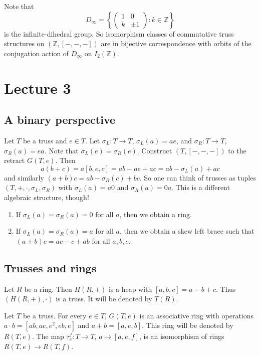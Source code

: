 \documentclass{svmult}
\newcommand{\Z}{\mathbb{Z}}
\begin{document}
Note that
\[
D_\infty=\left\{\begin{pmatrix}
1&0\\k&\pm 1
\end{pmatrix}:k\in\Z\right\}
\]
is the infinite-dihedral group. So isomorphism classes
of commutative truss structures on 
$\left(\Z,[-,-,-]\right)$ are in bijective correspondence with orbits of the conjugation 
action of $D_\infty$ on $I_2(\Z)$. 

\section{Lecture 3}

\subsection{A binary perspective}

Let $T$ be a truss and $e\in T$. Let $\sigma_L\colon T\to T$, $\sigma_L(a)=ae$, and 
$\sigma_R\colon T\to T$, $\sigma_R(a)=ea$. Note that $\sigma_L(e)=\sigma_R(e)$. 
Construct $\left(T,[-,-,-]\right)$ to the retract $G(T,e)$. Then
\[
a(b+c)=a[b,e,c]=ab-ae+ac=ab-\sigma_L(a)+ac
\]
and similarly $(a+b)c=ab-\sigma_R(c)+bc$. So one can think of trusses
as tuples $(T,+,\cdot,\sigma_L,\sigma_R)$ with 
$\sigma_L(a)=a0$ and $\sigma_R(a)=0a$. This is a different algebraic structure, though! 
\begin{enumerate}
    \item If $\sigma_L(a)=\sigma_R(a)=0$ for all $a$, then we obtain a ring. 
    \item If $\sigma_L(a)=\sigma_R(a)=a$ for all $a$, then we obtain a 
        skew left brace such that 
        $(a+b)c=ac-c+ab$ for all $a,b,c$.
\end{enumerate}

\subsection{Trusses and rings}

\begin{example}
    Let $R$ be a ring. Then $H(R,+)$ is a heap with $[a,b,c]=a-b+c$. Thus 
    $\left(H(R,+),\cdot\right)$ is a truss. It will be denoted by $T(R)$. 
\end{example}

\begin{theorem}
\label{thm:ring}
    Let $T$ be a truss. For every $e\in T$, $G(T,e)$ is an associative
    ring with operations $a\cdot b=[ab,ae,e^2,eb,e]$
    and $a+b=[a,e,b]$.
    This ring will be denoted by $R(T,e)$. 
    The map 
    $\tau_e^f\colon T\to T$, $a\mapsto [a,e,f]$, is an isomorphism of rings 
    $R(T,e)\to R(T,f)$. 
\end{theorem}
\end{document}
